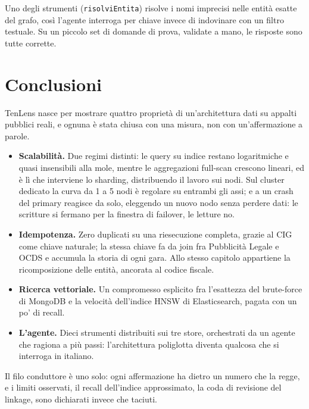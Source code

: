 \documentclass[11pt,a4paper]{article}
\begin{document}
Uno degli strumenti (\texttt{risolviEntita}) risolve i nomi imprecisi nelle entità esatte del
grafo, così l'agente interroga per chiave invece di indovinare con un filtro testuale. Su un
piccolo set di domande di prova, validate a mano, le risposte sono tutte corrette.

\section{Conclusioni}

TenLens nasce per mostrare quattro proprietà di un'architettura dati su appalti pubblici reali,
e ognuna è stata chiusa con una misura, non con un'affermazione a parole.

\begin{itemize}
  \item \textbf{Scalabilità.} Due regimi distinti: le query su indice restano logaritmiche e
        quasi insensibili alla mole, mentre le aggregazioni full-scan crescono lineari, ed è
        lì che interviene lo sharding, distribuendo il lavoro sui nodi. Sul cluster dedicato la
        curva da 1 a 5 nodi è regolare su entrambi gli assi; e a un crash del primary reagisce
        da solo, eleggendo un nuovo nodo senza perdere dati: le scritture si fermano per la
        finestra di failover, le letture no.
  \item \textbf{Idempotenza.} Zero duplicati su una riesecuzione completa, grazie al CIG come
        chiave naturale; la stessa chiave fa da join fra Pubblicità Legale e OCDS e accumula la
        storia di ogni gara. Allo stesso capitolo appartiene la ricomposizione delle entità,
        ancorata al codice fiscale.
  \item \textbf{Ricerca vettoriale.} Un compromesso esplicito fra l'esattezza del brute-force di
        MongoDB e la velocità dell'indice HNSW di Elasticsearch, pagata con un po' di recall.
  \item \textbf{L'agente.} Dieci strumenti distribuiti sui tre store, orchestrati da un agente
        che ragiona a più passi: l'architettura poliglotta diventa qualcosa che si interroga in
        italiano.
\end{itemize}

\noindent
Il filo conduttore è uno solo: ogni affermazione ha dietro un numero che la regge, e i limiti
osservati, il recall dell'indice approssimato, la coda di revisione del linkage, sono
dichiarati invece che taciuti.
\end{document}
